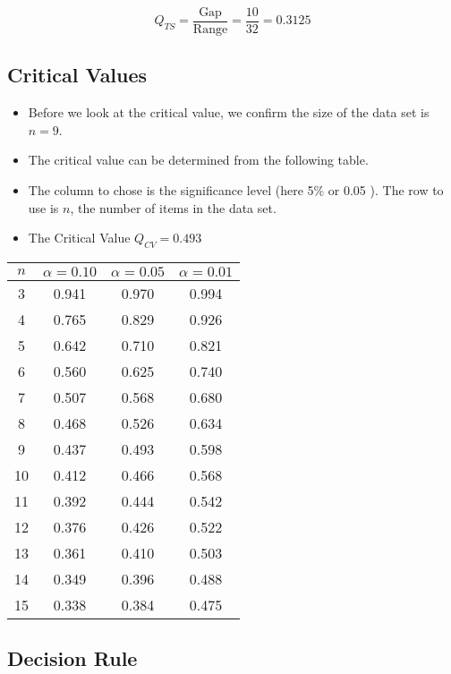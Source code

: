 \documentclass[a4paper,12pt]{article}
\begin{document}
\[ Q_{TS} =  \frac{\mbox{Gap}}{\mbox{Range}} = \frac{10}{32} = 0.3125 \]

\subsection*{Critical Values}

\begin{itemize}
    \item Before we look at the critical value, we confirm the size of the data set is $n=9$.

\item The critical value can be determined from the following table. 

\item  The column to chose is the significance level (here 5\% or 0.05 ). The row to use is $n$, the number of items in the data set.

\item The Critical Value $Q_{CV} = 0.493$
\end{itemize}


\begin{center}
\begin{tabular}{|c|c|c|c|}
\hline
$n$	&	$\alpha=0.10$	&	$\alpha=0.05$	&	$\alpha=0.01$	\\ \hline
3	&	0.941	&	0.970	&	0.994	\\ \hline
4	&	0.765	&	0.829	&	0.926	\\ \hline
5	&	0.642	&	0.710	&	0.821	\\ \hline
6	&	0.560	&	0.625	&	0.740	\\ \hline
7	&	0.507	&	0.568	&	0.680	\\ \hline
8	&	0.468	&	0.526	&	0.634	\\ \hline
9	&	0.437	&	0.493	&	0.598	\\ \hline
10	&	0.412	&	0.466	&	0.568	\\ \hline
11	&	0.392	&	0.444	&	0.542	\\ \hline
12	&	0.376	&	0.426	&	0.522	\\ \hline
13	&	0.361	&	0.410	&	0.503	\\ \hline
14	&	0.349	&	0.396	&	0.488	\\ \hline
15	&	0.338	&	0.384	&	0.475	\\ \hline

\end{tabular} 
\end{center}

\subsection*{Decision Rule}
\end{document}
